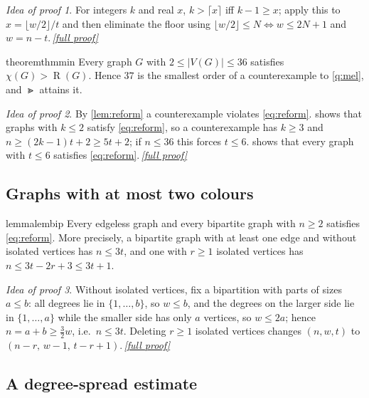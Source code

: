 \documentclass[11pt,a4paper]{article}
\theoremstyle{plain}
\theoremstyle{definition}
\theoremstyle{remark}
\newtheorem*{proofidea}{Idea of proof}
\newcommand{\fullproofref}[1]{\,\hyperref[#1]{\textit{[full proof]}}}
\newcommand{\fl}[1]{\lfloor #1\rfloor}
\newcommand{\ce}[1]{\lceil #1\rceil}
\newcommand{\RHS}{\operatorname{R}}
\begin{document}
\begin{proofidea}
For integers $k$ and real $x$, $k>\ce{x}$ iff $k-1\ge x$; apply this to $x=\fl{w/2}/t$ and then eliminate the floor using $\fl{w/2}\le N\iff w\le2N+1$ and $w=n-t$.\fullproofref{pf:reform}
\end{proofidea}

\begin{restatable}[Minimality]{theorem}{thmmin}\label{thm:min}
Every graph $G$ with $2\le|V(G)|\le36$ satisfies $\chi(G)>\RHS(G)$. Hence $37$ is the smallest order of a counterexample to \cref{q:mel}, and $\Gt$ attains it.
\end{restatable}

\begin{proofidea}
By \cref{lem:reform} a counterexample violates \eqref{eq:reform}.  shows that graphs with $k\le2$ satisfy \eqref{eq:reform}, so a counterexample has $k\ge3$ and $n\ge(2k-1)t+2\ge5t+2$; if $n\le36$ this forces $t\le6$.  shows that every graph with $t\le6$ satisfies \eqref{eq:reform}.\fullproofref{pf:min}
\end{proofidea}

\subsection{Graphs with at most two colours}

\begin{restatable}{lemma}{lembip}\label{lem:bip}
Every edgeless graph and every bipartite graph with $n\ge2$ satisfies \eqref{eq:reform}. More precisely, a bipartite graph with at least one edge and without isolated vertices has $n\le3t$, and one with $r\ge1$ isolated vertices has $n\le 3t-2r+3\le3t+1$.
\end{restatable}

\begin{proofidea}
Without isolated vertices, fix a bipartition with parts of sizes $a\le b$: all degrees lie in $\{1,\dots,b\}$, so $w\le b$, and the degrees on the larger side lie in $\{1,\dots,a\}$ while the smaller side has only $a$ vertices, so $w\le2a$; hence $n=a+b\ge\tfrac32 w$, i.e.\ $n\le3t$. Deleting $r\ge1$ isolated vertices changes $(n,w,t)$ to $(n-r,\,w-1,\,t-r+1)$.\fullproofref{pf:bip}
\end{proofidea}

\subsection{A degree-spread estimate}
\end{document}
